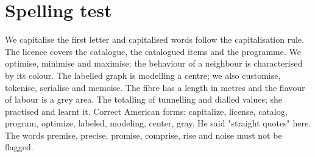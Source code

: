 \section{Spelling test}
We capitalise the first letter and capitalised words follow the capitalisation rule.
The licence covers the catalogue, the catalogued items and the programme.
We optimise, minimise and maximise; the behaviour of a neighbour is characterised by its colour.
The labelled graph is modelling a centre; we also customise, tokenise, serialise and memoise.
The fibre has a length in metres and the flavour of labour is a grey area.
The totalling of tunnelling and dialled values; she practised and learnt it.
Correct American forms: capitalize, license, catalog, program, optimize, labeled, modeling, center, gray.
He said "straight quotes" here.
The words premise, precise, promise, comprise, rise and noise must not be flagged.
